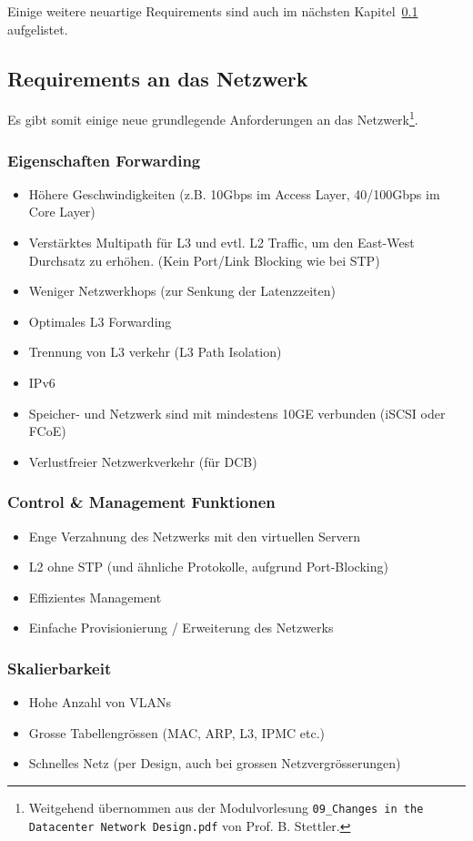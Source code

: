 Einige weitere neuartige Requirements sind auch im nächsten Kapitel~\ref{sec:requirements-an-das-netzwerk} aufgelistet.

\subsection{Requirements an das Netzwerk}\label{sec:requirements-an-das-netzwerk}
Es gibt somit einige neue grundlegende Anforderungen an das Netzwerk\footnote{Weitgehend übernommen aus der Modulvorlesung \lstinline|09_Changes in the Datacenter Network Design.pdf| von Prof. B. Stettler.}.
\subsubsection{Eigenschaften Forwarding}
\begin{itemize}
	\item Höhere Geschwindigkeiten (z.B. 10Gbps im Access Layer, 40/100Gbps im Core Layer)
	\item Verstärktes Multipath für L3 und evtl. L2 Traffic, um den East-West Durchsatz zu erhöhen. (Kein Port/Link Blocking wie bei STP)
	\item Weniger Netzwerkhops (zur Senkung der Latenzzeiten)
	\item Optimales L3 Forwarding
	\item Trennung von L3 verkehr (L3 Path Isolation)
	\item IPv6
	\item Speicher- und Netzwerk sind mit mindestens 10GE verbunden (iSCSI oder FCoE)
	\item Verlustfreier Netzwerkverkehr (für DCB)
\end{itemize}

\subsubsection{Control \& Management Funktionen}
\begin{itemize}
	\item Enge Verzahnung des Netzwerks mit den virtuellen Servern
	\item L2 ohne STP (und ähnliche Protokolle, aufgrund Port-Blocking)
	\item Effizientes Management
	\item Einfache Provisionierung / Erweiterung des Netzwerks
\end{itemize}


\subsubsection{Skalierbarkeit}
\begin{itemize}
	\item Hohe Anzahl von VLANs
	\item Grosse Tabellengrössen (MAC, ARP, L3, IPMC etc.)
	\item Schnelles Netz (per Design, auch bei grossen Netzvergrösserungen)
\end{itemize}


